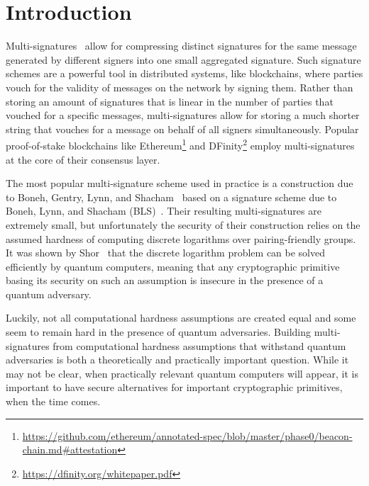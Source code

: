 \section{Introduction}\label{sec:intro}

Multi-signatures~\cite{NEC:ItaNak83,CCS:MicOhtRey01} allow for compressing distinct signatures for the same message generated by different signers into one small aggregated signature.
Such signature schemes are a powerful tool in distributed systems, like blockchains, where parties vouch for the validity of messages on the network by signing them. 
Rather than storing an amount of signatures that is linear in the number of parties that vouched for a specific messages, multi-signatures allow for storing a much shorter string that vouches for a message on behalf of all signers simultaneously.
Popular proof-of-stake blockchains like Ethereum\footnote{\url{https://github.com/ethereum/annotated-spec/blob/master/phase0/beacon-chain.md\#attestation}} and DFinity\footnote{\url{https://dfinity.org/whitepaper.pdf}} employ multi-signatures at the core of their consensus layer.

The most popular multi-signature scheme used in practice is a construction due to Boneh, Gentry, Lynn, and Shacham~\cite{EC:BGLS03} based on a signature scheme due to Boneh, Lynn, and Shacham (BLS)~\cite{AC:BonLynSha01}.
Their resulting multi-signatures are extremely small, but unfortunately the security of their construction relies on the assumed hardness of computing discrete logarithms over pairing-friendly groups.
It was shown by Shor~\cite{Shor94} that the discrete logarithm problem can be solved efficiently by quantum computers, meaning that any cryptographic primitive basing its security on such an assumption is insecure in the presence of a quantum adversary.

Luckily, not all computational hardness assumptions are created equal and some seem to remain hard in the presence of quantum adversaries. 
Building multi-signatures from computational hardness assumptions that withstand quantum adversaries is both a theoretically and practically important question.
While it may not be clear, when practically relevant quantum computers will appear, it is important to have secure alternatives for important cryptographic primitives, when the time comes.

